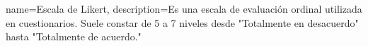 \cleardoublepage
{}

{
    name=Escala de Likert,
    description={Es una escala de evaluación ordinal utilizada en cuestionarios. Suele constar de 5 a 7 niveles desde "Totalmente en desacuerdo" hasta "Totalmente de acuerdo."}
}

\printglossaries